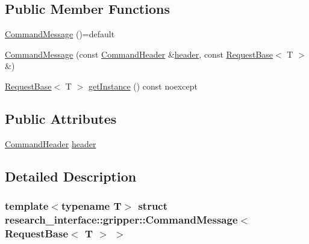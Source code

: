 \subsection*{Public Member Functions}
\begin{DoxyCompactItemize}
\item 
\hyperlink{structresearch__interface_1_1gripper_1_1CommandMessage_3_01RequestBase_3_01T_01_4_01_4_a54a36e491c070ae527d618e4691ebf69}{Command\+Message} ()=default
\item 
\hyperlink{structresearch__interface_1_1gripper_1_1CommandMessage_3_01RequestBase_3_01T_01_4_01_4_a79dc73032ac3f8c142d22fd9e0124f34}{Command\+Message} (const \hyperlink{structresearch__interface_1_1gripper_1_1CommandHeader}{Command\+Header} \&\hyperlink{structresearch__interface_1_1gripper_1_1CommandMessage_3_01RequestBase_3_01T_01_4_01_4_a3ac3bc01bbe1e063fb3f8dae485f18e2}{header}, const \hyperlink{structresearch__interface_1_1gripper_1_1RequestBase}{Request\+Base}$<$ T $>$ \&)
\item 
\hyperlink{structresearch__interface_1_1gripper_1_1RequestBase}{Request\+Base}$<$ T $>$ \hyperlink{structresearch__interface_1_1gripper_1_1CommandMessage_3_01RequestBase_3_01T_01_4_01_4_a8577469e81c7396ff94fa745e893d204}{get\+Instance} () const noexcept
\end{DoxyCompactItemize}
\subsection*{Public Attributes}
\begin{DoxyCompactItemize}
\item 
\hyperlink{structresearch__interface_1_1gripper_1_1CommandHeader}{Command\+Header} \hyperlink{structresearch__interface_1_1gripper_1_1CommandMessage_3_01RequestBase_3_01T_01_4_01_4_a3ac3bc01bbe1e063fb3f8dae485f18e2}{header}
\end{DoxyCompactItemize}


\subsection{Detailed Description}
\subsubsection*{template$<$typename T$>$\newline
struct research\+\_\+interface\+::gripper\+::\+Command\+Message$<$ Request\+Base$<$ T $>$ $>$}




